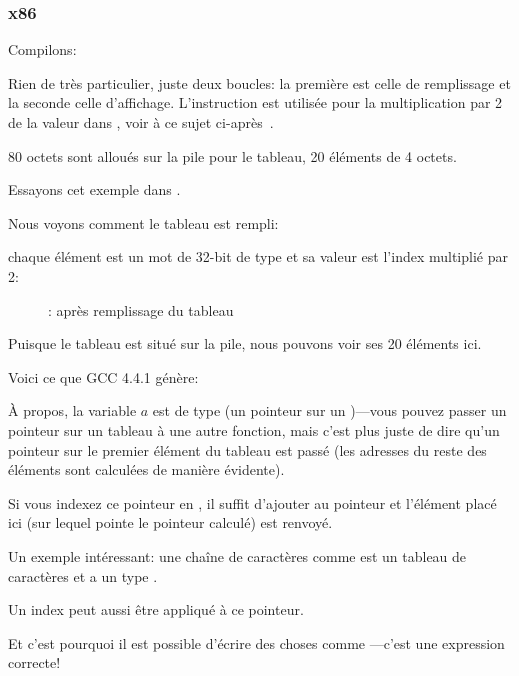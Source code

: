 \subsubsection{x86}


Compilons:




Rien de très particulier, juste deux boucles: la première est celle de remplissage
et la seconde celle d'affichage.
L'instruction  est utilisée pour la multiplication par 2 de la valeur
dans \ECX, voir à ce sujet ci-après~.

80 octets sont alloués sur la pile pour le tableau, 20 éléments de 4 octets.

\clearpage
Essayons cet exemple dans \olly.
\myindex{\olly}

Nous voyons comment le tableau est rempli:

chaque élément est un mot de 32-bit de type \Tint et sa valeur est l'index multiplié
par 2:

\begin{figure}[H]
\centering
{}
\caption{\olly: après remplissage du tableau}
\label{fig:array_simple_olly}
\end{figure}

Puisque le tableau est situé sur la pile, nous pouvons voir ses 20 éléments ici.


Voici ce que GCC 4.4.1 génère:



À propos, la variable $a$ est de type  (un pointeur sur un \Tint{})---vous
pouvez passer un pointeur sur un tableau à une autre fonction, mais c'est plus juste
de dire qu'un pointeur sur le premier élément du tableau est passé (les adresses
du reste des éléments sont calculées de manière évidente).

Si vous indexez ce pointeur en , il suffit d'ajouter  au pointeur
et l'élément placé ici (sur lequel pointe le pointeur calculé) est renvoyé.

Un exemple intéressant: une chaîne de caractères comme  est un tableau
de caractères et a un type .

Un index peut aussi être appliqué à ce pointeur.

Et c'est pourquoi il est possible d'écrire des choses comme ---c'est
une expression \CCpp correcte!

